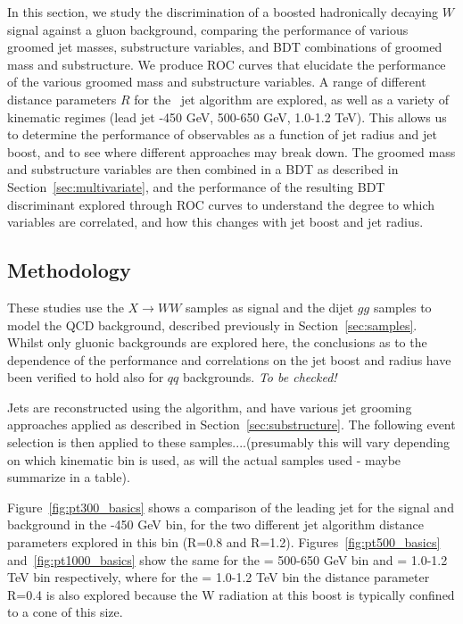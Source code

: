 In this section, we study the discrimination of a boosted hadronically decaying $W$ signal against a gluon
background, comparing the performance of various groomed jet
masses, substructure variables, and BDT combinations of groomed mass
and substructure. We produce ROC
curves that elucidate the performance of the various groomed mass and
substructure variables. A
range of different distance parameters $R$ for the \antikt~jet
algorithm are explored, as well as a variety of kinematic regimes
(lead jet -450 GeV, 500-650 GeV, 1.0-1.2 TeV). This allows us to determine the
performance of observables as a function of jet radius and jet boost, and to see
where different approaches may break down. The groomed
mass and substructure variables are then combined in a BDT as described in Section~\ref{sec:multivariate}, and the performance of the resulting BDT discriminant
explored through ROC curves to understand the degree to which
variables are correlated, and how
this changes with jet boost and jet radius. 

\subsection{Methodology}

These studies use the $X \rightarrow WW$ samples as signal and the dijet $gg$
samples to model the QCD background, described previously in Section~\ref{sec:samples}. Whilst only gluonic backgrounds
are explored here, the conclusions as to the dependence of the
performance and correlations on the jet boost and radius have been
verified to hold also for $qq$ backgrounds. {\it To be checked!}

Jets are reconstructed using the \antikt algorithm, and have various
jet grooming approaches applied as described in Section~\ref{sec:substructure}. The following event selection is then applied to these
samples....(presumably this will vary depending on which kinematic bin
is used, as will the actual samples used - maybe summarize in a table).

Figure~\ref{fig:pt300_basics} shows a comparison of the
leading jet \pt for the signal and background in the -450 GeV bin, for the two different \antikt jet
algorithm distance parameters explored in this bin (R=0.8 and R=1.2). Figures~\ref{fig:pt500_basics} and~\ref{fig:pt1000_basics}  show the same for the
\pt = 500-650 GeV bin and \pt = 1.0-1.2 TeV bin respectively, where for
the \pt = 1.0-1.2 TeV bin the distance parameter R=0.4 is also explored because the W radiation at this boost is typically confined to 
a cone of this size.

